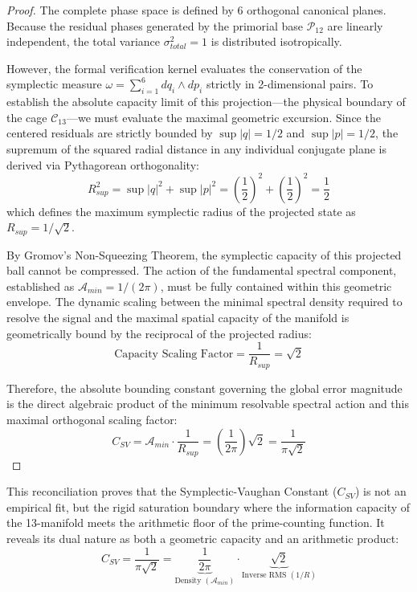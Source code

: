 \documentclass[sn-mathphys-num, pdflatex, referee]{sn-jnl}
\begin{document}
\begin{proof}
The complete phase space is defined by 6 orthogonal canonical planes. Because the residual phases generated by the primorial base $\mathcal{P}_{12}$ are linearly independent, the total variance $\sigma_{total}^2 = 1$ is distributed isotropically. 

However, the formal verification kernel evaluates the conservation of the symplectic measure $\omega = \sum_{i=1}^{6} dq_i \wedge dp_i$ strictly in 2-dimensional pairs. To establish the absolute capacity limit of this projection—the physical boundary of the cage $\mathcal{C}_{13}$—we must evaluate the maximal geometric excursion. Since the centered residuals are strictly bounded by $\sup|q| = 1/2$ and $\sup|p| = 1/2$, the supremum of the squared radial distance in any individual conjugate plane is derived via Pythagorean orthogonality:
$$ R_{sup}^2 = \sup|q|^2 + \sup|p|^2 = \left(\frac{1}{2}\right)^2 + \left(\frac{1}{2}\right)^2 = \frac{1}{2} $$
which defines the maximum symplectic radius of the projected state as $R_{sup} = 1/\sqrt{2}$.

By Gromov's Non-Squeezing Theorem, the symplectic capacity of this projected ball cannot be compressed. The action of the fundamental spectral component, established as $\mathcal{A}_{min} = 1/(2\pi)$, must be fully contained within this geometric envelope. The dynamic scaling between the minimal spectral density required to resolve the signal and the maximal spatial capacity of the manifold is geometrically bound by the reciprocal of the projected radius:
$$ \text{Capacity Scaling Factor} = \frac{1}{R_{sup}} = \sqrt{2} $$

Therefore, the absolute bounding constant governing the global error magnitude is the direct algebraic product of the minimum resolvable spectral action and this maximal orthogonal scaling factor:
$$ C_{SV} = \mathcal{A}_{min} \cdot \frac{1}{R_{sup}} = \left(\frac{1}{2\pi}\right) \sqrt{2} = \frac{1}{\pi\sqrt{2}} $$
\end{proof}

This reconciliation proves that the Symplectic-Vaughan Constant ($C_{SV}$) is not an empirical fit, but the rigid saturation boundary where the information capacity of the 13-manifold meets the arithmetic floor of the prime-counting function. It reveals its dual nature as both a geometric capacity and an arithmetic product:
\begin{equation}
C_{SV} = \frac{1}{\pi\sqrt{2}} = \underbrace{\frac{1}{2\pi}}_{\text{Density } (\mathcal{A}_{min})} \cdot \underbrace{\sqrt{2}}_{\text{Inverse RMS } (1/R)}
\label{CSV}
\end{equation}
\end{document}
